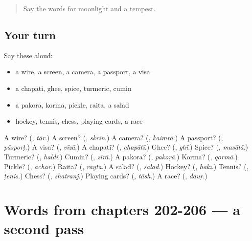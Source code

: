 \label{lesson:UR-R206-first-pass-words-from-chapters-198-201}



\begin{quote}
Say the words for moonlight and a tempest.
\end{quote}

\subsection*{Your turn}
Say these aloud:

\begin{itemize}
\raggedright
  \item a wire, a screen, a camera, a passport, a visa
  \item a chapati, ghee, spice, turmeric, cumin
  \item a pakora, korma, pickle, raita, a salad
  \item hockey, tennis, chess, playing cards, a race
\end{itemize}

\begin{tcolorbox}[breakable,colback=teal!4,colframe=teal!35!black,title={Before you move on}]
A wire? (\textbf{}, \emph{tār}.) A screen? (\textbf{}, \emph{skrīn}.) A camera? (\textbf{}, \emph{kaimrā}.) A passport? (\textbf{}, \emph{pāsporṭ}.) A visa? (\textbf{}, \emph{vīzā}.) A chapati? (\textbf{}, \emph{chapātī}.) Ghee? (\textbf{}, \emph{ghī}.) Spice? (\textbf{}, \emph{masālā}.) Turmeric? (\textbf{}, \emph{haldī}.) Cumin? (\textbf{}, \emph{zīrā}.) A pakora? (\textbf{}, \emph{pakoṛā}.) Korma? (\textbf{}, \emph{qormā}.) Pickle? (\textbf{}, \emph{achār}.) Raita? (\textbf{}, \emph{rāytā}.) A salad? (\textbf{}, \emph{salād}.) Hockey? (\textbf{}, \emph{hākī}.) Tennis? (\textbf{}, \emph{ṭenis}.) Chess? (\textbf{}, \emph{shatranj}.) Playing cards? (\textbf{}, \emph{tāsh}.) A race? (\textbf{}, \emph{dauṛ}.)
\end{tcolorbox}
\section[(dialogue)]{Words from chapters 202-206 — a second pass}

\label{lesson:UR-R206-second-pass-words-from-chapters-202-206}



